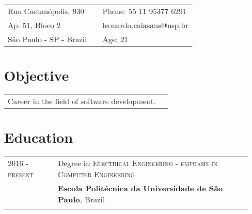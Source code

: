 \documentclass[a4paper,10pt]{article}
\begin{document}
{\centering \begin{tabular}{R{5cm} p{0.1cm} L{5.6cm}}
		Rua Caetanópolis, 930 & & Phone: 55 11 95377 6291\\
		Ap. 51, Bloco 2 & & {leonardo.calasans@usp.br}\\
		São Paulo - SP - Brazil & & Age: 21\\
	\end{tabular}

\section{Objective}

\vspace*{3pt}
\hspace*{-20pt}
\begin{tabular}{ll}

  Career in the field of software development.   & {}\\
\end{tabular}
\vspace*{5pt}


\section{Education}

\vspace*{3pt}
\hspace*{-12pt}
\begin{tabular}{R{3.5cm} p{10cm}}


\textsc{2016 - present} \emph{} & Degree in \textsc{}\textsc{Electrical Engineering - emphasis in Computer Engineering} \\&\textbf{Escola Politécnica da
Universidade de São Paulo}, Brazil\\
&\\




\end{tabular}}
\end{document}

